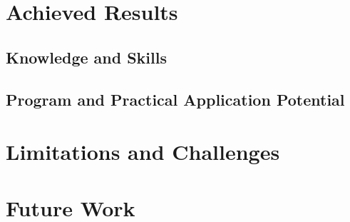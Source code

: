 \label{chap:conclusion}
\ThesisFlatNumbering

\section{Achieved Results}
\subsection{Knowledge and Skills}
\subsection{Program and Practical Application Potential}

\section{Limitations and Challenges}

\section{Future Work}

